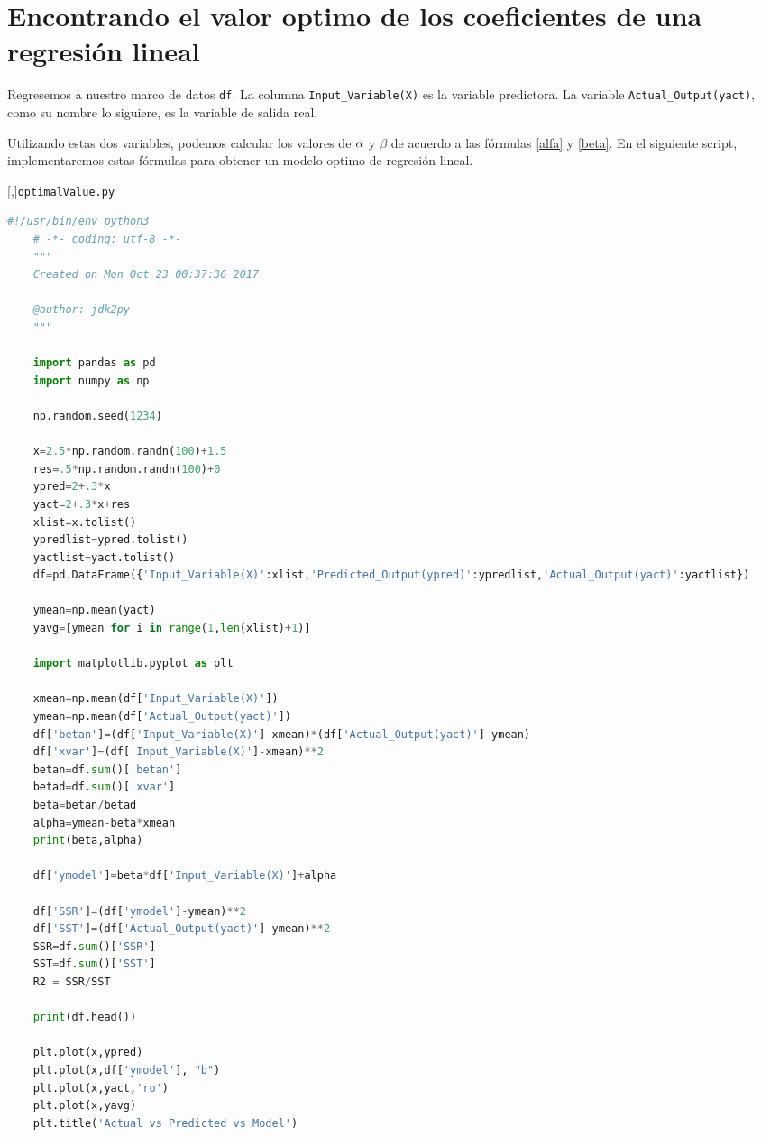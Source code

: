 \section{Encontrando el valor optimo de los coeficientes de una regresión lineal}

Regresemos a nuestro marco de datos \texttt{df}. La columna \texttt{Input\_Variable(X)} es la variable predictora. 
La variable \texttt{Actual\_Output(yact)}, como su nombre lo siguiere, es la variable de salida real.


Utilizando estas dos variables, podemos calcular los valores de $\alpha$ y $\beta$ de acuerdo a las fórmulas \eqref{alfa} y \eqref{beta}.  En el siguiente script, implementaremos estas fórmulas para obtener un modelo optimo de regresión lineal.

[,]{\texttt{optimalValue.py}}
\begin{lstlisting}[language=Python]
	#!/usr/bin/env python3
	# -*- coding: utf-8 -*-
	"""
	Created on Mon Oct 23 00:37:36 2017
	
	@author: jdk2py
	"""
	
	import pandas as pd
	import numpy as np
	
	np.random.seed(1234)
	
	x=2.5*np.random.randn(100)+1.5
	res=.5*np.random.randn(100)+0
	ypred=2+.3*x
	yact=2+.3*x+res
	xlist=x.tolist()
	ypredlist=ypred.tolist()
	yactlist=yact.tolist()
	df=pd.DataFrame({'Input_Variable(X)':xlist,'Predicted_Output(ypred)':ypredlist,'Actual_Output(yact)':yactlist})
	
	ymean=np.mean(yact)
	yavg=[ymean for i in range(1,len(xlist)+1)]
	
	import matplotlib.pyplot as plt
	
	xmean=np.mean(df['Input_Variable(X)'])
	ymean=np.mean(df['Actual_Output(yact)'])
	df['betan']=(df['Input_Variable(X)']-xmean)*(df['Actual_Output(yact)']-ymean)
	df['xvar']=(df['Input_Variable(X)']-xmean)**2
	betan=df.sum()['betan']
	betad=df.sum()['xvar']
	beta=betan/betad
	alpha=ymean-beta*xmean
	print(beta,alpha)
	
	df['ymodel']=beta*df['Input_Variable(X)']+alpha
	
	df['SSR']=(df['ymodel']-ymean)**2
	df['SST']=(df['Actual_Output(yact)']-ymean)**2
	SSR=df.sum()['SSR']
	SST=df.sum()['SST']
	R2 = SSR/SST
	
	print(df.head())
	
	plt.plot(x,ypred)
	plt.plot(x,df['ymodel'], "b")
	plt.plot(x,yact,'ro')
	plt.plot(x,yavg)
	plt.title('Actual vs Predicted vs Model')
\end{lstlisting}

